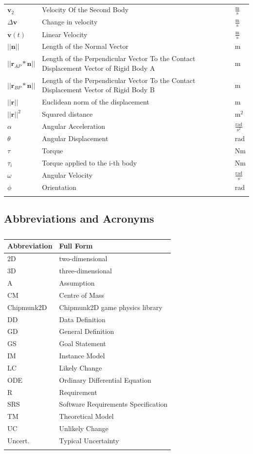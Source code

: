 \documentclass[12pt]{article}
\begin{document}
\begin{longtabu}{l X[l] l}
\\
${\mathbf{v}_{2}}$ & Velocity Of the Second Body & $\frac{\text{m}}{\text{s}}$
\\
$Δ\mathbf{v}$ & Change in velocity & $\frac{\text{m}}{\text{s}}$
\\
$\mathbf{v}(t)$ & Linear Velocity & $\frac{\text{m}}{\text{s}}$
\\
$||\mathbf{n}||$ & Length of the Normal Vector & m
\\
$||{\mathbf{r}_{AP}}*\mathbf{n}||$ & Length of the Perpendicular Vector To the Contact Displacement Vector of Rigid Body A & m
\\
$||{\mathbf{r}_{BP}}*\mathbf{n}||$ & Length of the Perpendicular Vector To the Contact Displacement Vector of Rigid Body B & m
\\
$||\mathbf{r}||$ & Euclidean norm of the displacement & m
\\
${||\mathbf{r}||^{2}}$ & Squared distance & $\text{m}^{2}$
\\
$α$ & Angular Acceleration & $\frac{\text{rad}}{\text{s}^{2}}$
\\
$θ$ & Angular Displacement & rad
\\
$τ$ & Torque & Nm
\\
${τ_{i}}$ & Torque applied to the i-th body & Nm
\\
$ω$ & Angular Velocity & $\frac{\text{rad}}{\text{s}}$
\\
$ϕ$ & Orientation & rad
\\
\bottomrule
\caption{}
\label{Table:ToS}
\end{longtabu}
\subsection{Abbreviations and Acronyms}
\label{Sec:TAbbAcc}
\begin{longtable}{l l}
\toprule
Abbreviation & Full Form
\\
\midrule
\endhead
2D & two-dimensional
\\
3D & three-dimensional
\\
A & Assumption
\\
CM & Centre of Mass
\\
Chipmunk2D & Chipmunk2D game physics library
\\
DD & Data Definition
\\
GD & General Definition
\\
GS & Goal Statement
\\
IM & Instance Model
\\
LC & Likely Change
\\
ODE & Ordinary Differential Equation
\\
R & Requirement
\\
SRS & Software Requirements Specification
\\
TM & Theoretical Model
\\
UC & Unlikely Change
\\
Uncert. & Typical Uncertainty
\\
\bottomrule
\caption{}
\label{Table:TAbbAcc}
\end{longtable}
\end{document}

